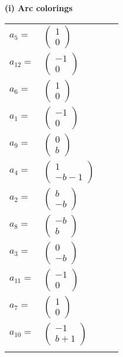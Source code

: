 \documentclass[1p]{elsarticle_modified}
\theoremstyle{definition}
\begin{document}
\flushleft \textbf{(i) Arc colorings}\\
\begin{tabular}{m{7pt} m{180pt} m{7pt} m{180pt} }
\flushright $a_{5}=$&$\begin{pmatrix}1\\0\end{pmatrix}$ \\
\flushright $a_{12}=$&$\begin{pmatrix}-1\\0\end{pmatrix}$ \\
\flushright $a_{6}=$&$\begin{pmatrix}1\\0\end{pmatrix}$ \\
\flushright $a_{1}=$&$\begin{pmatrix}-1\\0\end{pmatrix}$ \\
\flushright $a_{9}=$&$\begin{pmatrix}0\\b\end{pmatrix}$ \\
\flushright $a_{4}=$&$\begin{pmatrix}1\\- b-1\end{pmatrix}$ \\
\flushright $a_{2}=$&$\begin{pmatrix}b\\- b\end{pmatrix}$ \\
\flushright $a_{8}=$&$\begin{pmatrix}- b\\b\end{pmatrix}$ \\
\flushright $a_{3}=$&$\begin{pmatrix}0\\- b\end{pmatrix}$ \\
\flushright $a_{11}=$&$\begin{pmatrix}-1\\0\end{pmatrix}$ \\
\flushright $a_{7}=$&$\begin{pmatrix}1\\0\end{pmatrix}$ \\
\flushright $a_{10}=$&$\begin{pmatrix}-1\\b+1\end{pmatrix}$\\&\end{tabular}
\end{document}
